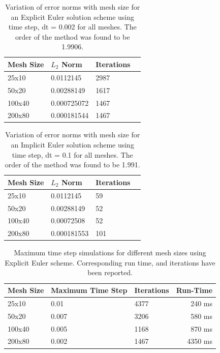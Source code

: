 \documentclass[a4paper,10pt]{article}
\begin{document}
\begin{enumerate}[I]
  \begin{table}
      \begin{center}
        \begin{tabular}{|l | l | l | r |}
          \hline
          Mesh Size & $L_2$ Norm & Iterations \\
          \hline
          25x10 & 0.0112145 & 2987 \\
          50x20 & 0.00288149  & 1617 \\
          100x40 & 0.000725072 & 1467 \\
          200x80 & 0.000181544 & 1467 \\
          \hline
        \end{tabular}
        \caption{Variation of error norms with mesh size for an Explicit Euler solution scheme using time step, dt = 0.002 for all meshes. The order of the method was found to be 1.9906.}
        \label{normEE}      
      \end{center}
    \end{table}

  \begin{table}
      \begin{center}
        \begin{tabular}{|l | l | l | r |}
          \hline
          Mesh Size & $L_2$ Norm & Iterations \\
          \hline
          25x10 & 0.0112145 & 59 \\
          50x20 & 0.00288149  & 52 \\
          100x40 & 0.00072508 & 52 \\
          200x80 & 0.000181553 & 101 \\
          \hline
        \end{tabular}
        \caption{Variation of error norms with mesh size for an Implicit Euler solution scheme using time step, dt = 0.1 for all meshes. The order of the method was found to be 1.991.}
        \label{normIE}      
      \end{center}
    \end{table}

  \begin{table}
      \begin{center}
        \begin{tabular}{|l | l | l | r |}
          \hline
          Mesh Size & Maximum Time Step & Iterations & Run-Time \\
          \hline
          25x10 & 0.01 & 4377 & 240 ms \\
          50x20 & 0.007 & 3206 & 580 ms \\
          100x40 & 0.005 & 1168 & 870 ms \\
          200x80 & 0.002 & 1467 & 4350 ms \\
          \hline
        \end{tabular}
        \caption{Maximum time step simulations for different mesh sizes using Explicit Euler scheme. Corresponding run time, and iterations have been reported.}
        \label{effEE}      
      \end{center}
    \end{table}



\end{enumerate}
\end{document}
